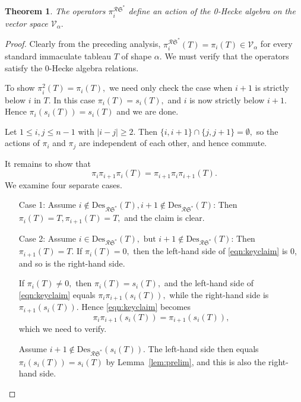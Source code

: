 \documentclass[12pt,letterpaper]{amsart}
\newtheorem{theorem}{Theorem}[section]
\theoremstyle{definition}
\newcommand{\rdI}{\mathcal{R}\mathfrak{S}^*}
\begin{document}
\begin{theorem}\label{thm:Hecke-action-RSImm} The operators $\pi^{\rdI}_i$ define an action of the 0-Hecke algebra on the vector space $\mathcal{V}_\alpha.$ 
\end{theorem}
\begin{proof}  Clearly from the preceding analysis, $\pi^{\rdI}_i(T)=\pi_i(T)\in \mathcal{V}_\alpha$  for every standard immaculate tableau $T$ of shape $\alpha.$ We must verify that the operators satisfy the 0-Hecke algebra relations.

To show $\pi_i^2(T)=\pi_i(T),$ we need only check the case when $i+1$ is strictly below $i$ in $T$. In this case $\pi_i(T)=s_i(T),$ and $i$ is now strictly below $i+1$. Hence $\pi_i(s_i(T))=s_i(T)$ and we are done.

Let $1\le i,j\le n-1$ with $|i-j|\ge 2.$ Then $\{i, i+1\}\cap \{j, j+1\}=\emptyset,$ so the actions of $\pi_i$ and $\pi_j$ are independent of each other, and hence commute.

It remains to show that 
\begin{equation}\label{eqn:keyclaim}\pi_i \pi_{i+1} \pi_i(T)=\pi_{i+1} \pi_i \pi_{i+1}(T).
\end{equation}  We examine  four separate cases.

\begin{enumerate}
\item[Case 1:] Assume $i\notin \mathrm{Des}_{\mathcal{R}\mathfrak{S^*}}(T), i+1\notin \mathrm{Des}_{\mathcal{R}\mathfrak{S^*}}(T)$: 
Then $\pi_i(T)=T, \pi_{i+1}(T)=T, $ and the claim is clear.

\item[Case 2:] Assume $i\in \mathrm{Des}_{\mathcal{R}\mathfrak{S^*}}(T), \text{ but }i+1\notin \mathrm{Des}_{\mathcal{R}\mathfrak{S^*}}(T)$: Then $\pi_{i+1}(T)=T.$ 
If $\pi_i(T)=0,$ then the left-hand side of \eqref{eqn:keyclaim} is 0, and so is the right-hand side.

If $\pi_i(T)\ne 0,$ then $\pi_i(T)=s_i(T),$ and the left-hand side of \eqref{eqn:keyclaim} equals 
$\pi_i\pi_{i+1}(s_i(T)),$ while the right-hand side is $\pi_{i+1}(s_i(T)).$ Hence \eqref{eqn:keyclaim} becomes 
\begin{equation}\label{eqn:step1}\pi_i \pi_{i+1} ( s_i(T))= \pi_{i+1}(s_i(T)),
\end{equation}
which we need to verify.

Assume $i+1\notin \mathrm{Des}_{\mathcal{R}\mathfrak{S^*}}(s_i(T)).$ 
The left-hand side then equals $\pi_i(s_i(T))=s_i(T)$  by Lemma~\ref{lem:prelim}, and this is also the right-hand side.


\end{enumerate}
\end{proof}
\end{document}
